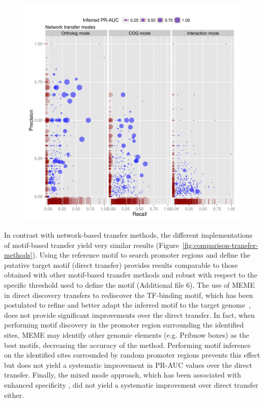 \begin{figure}
  \centering
  \includegraphics[width=\textwidth]{figures/chapter3/network-transfer-auc}
  \caption{}
\label{fig:network-transfer-auc}
\end{figure}

In contrast with network-based transfer methods, the different implementations
of motif-based transfer yield very similar results
(Figure~\ref{fig:comparison-transfer-methods}). Using the reference motif to
search promoter regions and define the putative target motif (direct transfer)
provides results comparable to those obtained with other motif-based transfer
methods and robust with respect to the specific threshold used to define the
motif (Additional file 6). The use of MEME in direct discovery transfers to
rediscover the TF-binding motif, which has been postulated to refine and better
adapt the inferred motif to the target genome~\cite{habib2012functional}, does
not provide significant improvements over the direct transfer. In fact, when
performing motif discovery in the promoter region surrounding the identified
sites, MEME may identify other genomic elements (e.g. Pribnow boxes) as the
best motifs, decreasing the accuracy of the method. Performing motif inference
on the identified sites surrounded by random promoter regions prevents this
effect but does not yield a systematic improvement in PR-AUC values over the
direct transfer. Finally, the mixed mode approach, which has been associated
with enhanced specificity \cite{baumbach2010power, baumbach2009reliable}, did
not yield a systematic improvement over direct transfer either.

